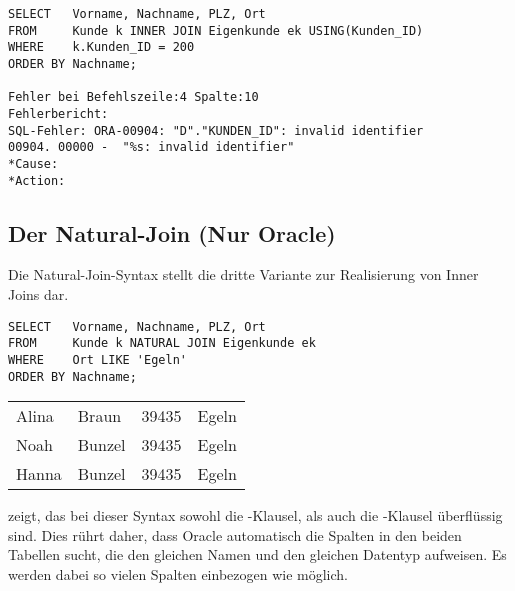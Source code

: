 \begin{lstlisting}[language=oracle_sql,caption={Fehlerhafte Nutzung der USING-Klausel in Oracle},label=sql04_07]
SELECT   Vorname, Nachname, PLZ, Ort
FROM     Kunde k INNER JOIN Eigenkunde ek USING(Kunden_ID)
WHERE    k.Kunden_ID = 200
ORDER BY Nachname;

Fehler bei Befehlszeile:4 Spalte:10
Fehlerbericht:
SQL-Fehler: ORA-00904: "D"."KUNDEN_ID": invalid identifier
00904. 00000 -  "%s: invalid identifier"
*Cause:
*Action:
        \end{lstlisting}
\subsection{Der Natural-Join (Nur Oracle)}
Die Natural-Join-Syntax stellt die dritte Variante zur Realisierung von Inner Joins dar.
\clearpage
\begin{lstlisting}[language=oracle_sql,caption={Die Natural-Join-Syntax},label=sql04_08]
SELECT   Vorname, Nachname, PLZ, Ort
FROM     Kunde k NATURAL JOIN Eigenkunde ek
WHERE    Ort LIKE 'Egeln'
ORDER BY Nachname;
          \end{lstlisting}
\begin{center}
    \begin{small}
        \tablehead{}
        \begin{oraclesql}
            \begin{supertabular}{llll}
                Alina & Braun & 39435 & Egeln \\
                Noah & Bunzel & 39435 & Egeln \\
                Hanna & Bunzel & 39435 & Egeln \\
            \end{supertabular}
        \end{oraclesql}
    \end{small}
\end{center}
 zeigt, das bei dieser Syntax sowohl die -Klausel, als auch die -Klausel überflüssig sind. Dies rührt daher, dass Oracle automatisch die Spalten in den beiden Tabellen sucht, die den gleichen Namen und den gleichen Datentyp aufweisen. Es werden dabei so vielen Spalten einbezogen wie möglich.

